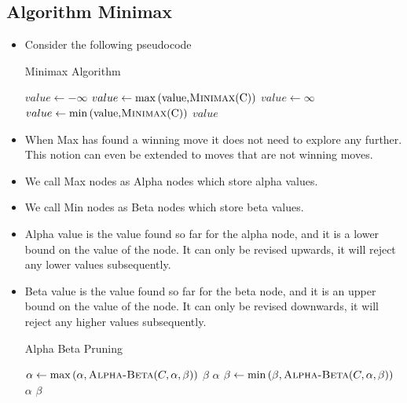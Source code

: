 \documentclass[a4paper]{article}
\begin{document}
\subsection{Algorithm Minimax}
\begin{itemize}
    \item Consider the following pseudocode
    \begin{algorithm}[H]
        \caption{Minimax Algorithm}\label{AI-minimax-alg}
        \begin{algorithmic}[1]
            \Statex {}
                \State \Return {}
            \EndIf
                \State $value \gets -\infty$
                    \State $value \gets \max{(\text{value,\Call{Minimax}{C}})}$
                \EndFor
            \Else
                \State $value\gets \infty$
                    \State $value \gets \min{(\text{value,\Call{Minimax}{C}})}$
                \EndFor
            \EndIf
            \State \Return $value$
        \end{algorithmic}
    \end{algorithm}
    \item When Max has found a winning move it does not need to explore any further. This notion can even be extended to moves that are not winning moves.
    \item We call Max nodes as Alpha nodes which store alpha values.
    \item We call Min nodes as Beta nodes which store beta values.
    \item Alpha value is the value found so far for the alpha node, and it is a lower bound on the value of the node. It can only be revised upwards, it will reject any lower values subsequently.
    \item Beta value is the value found so far for the beta node, and it is an upper bound on the value of the node. It can only be revised downwards, it will reject any higher values subsequently.
    \begin{algorithm}[H]
        \caption{Alpha Beta Pruning}\label{AI-alpha-beta-pruning}
        \begin{algorithmic}[1]
            \Statex {}
                \State \Return {}
            \EndIf
                    \State $\alpha \gets \max{(\alpha,\text{\Call{Alpha-Beta}{$C,\alpha,\beta$}})}$
                    \If{$\alpha \geq \beta$} \Return $\beta$ \EndIf
                \EndFor
                \State \Return $\alpha$
            \Else
                    \State $\beta \gets \min{(\beta,\text{\Call{Alpha-Beta}{$C,\alpha,\beta$}})}$
                    \If{$\alpha \geq \beta$} \Return $\alpha$ \EndIf
                \EndFor
                \State \Return $\beta$
            \EndIf
        \end{algorithmic}
    \end{algorithm}
\end{itemize}
\end{document}
